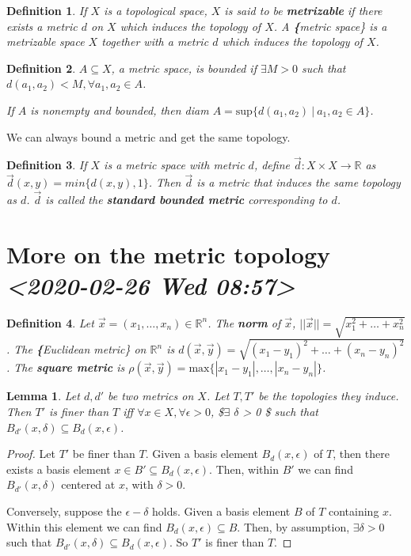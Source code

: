 \documentclass[11pt]{article}
\newtheorem{lemma}{Lemma}[section]
\newtheorem{definition}{Definition}[section]
\begin{document}
\begin{definition}
If \(X\) is a topological space, \(X\) is said to be \textbf{metrizable} if there
exists a metric \(d\) on \(X\) which induces the topology of \(X\). A \textbf\{metric
space\} is a metrizable space \(X\) together with a metric \(d\) which induces the
topology of \(X\). 
\end{definition}

\begin{definition}
\(A\subseteq X\), a metric space, is bounded if \(\exists M > 0\) such that
\(d(a_1,a_2) < M, \forall a_1,a_2 \in A\). 

If \(A\) is nonempty and bounded, then diam \(A = \text{sup}\{ d(a_1, a_2)\ |\ a_1,
a_2 \in A\}\). 
\end{definition}

We can always bound a metric and get the same topology. 
\begin{definition}
If \(X\) is a metric space with metric \(d\), define \(\vec{d}: X\times
X\rightarrow\mathbb{R}\) as \(\vec{d}(x,y) = min\{ d(x,y), 1\}\). Then \(\vec{d}\)
is a metric that induces the same topology as \(d\). \(\vec{d}\) is called the
\textbf{standard bounded metric} corresponding to \(d\). 
\end{definition}

\section{More on the metric topology \textit{<2020-02-26 Wed 08:57>}}
\label{sec:orgb517c71}
\begin{definition}
Let \(\vec{x} = (x_1,\ldots, x_n) \in \mathbb{R}^n\). The \textbf{norm} of
\(\vec{x}\), \(||\vec{x}|| = \sqrt{x_1^2 + \ldots + x_n^2}\). The \textbf\{Euclidean
metric\} on \(\mathbb{R}^n\) is \(d(\vec{x}, \vec{y}) = \sqrt{(x_1 - y_1)^2 +
\ldots + (x_n - y_n)^2}\). The \textbf{square metric} is \(\rho(\vec{x},\vec{y}) =
\text{max}\{|x_1 - y_1|, \ldots, |x_n - y_n|\}\). 
\end{definition}
\begin{lemma}
Let \(d, d'\) be two metrics on \(X\). Let \(T, T'\) be the topologies they induce.
Then \(T'\) is finer than \(T\) iff \(\forall x \in X, \forall \epsilon > 0\),
\$\(\exists\) \(\delta\) > 0 \$ such that \(B_{d'}(x,\delta) \subseteq B_d(x,\epsilon)\).
\end{lemma}
\begin{proof}
Let \(T'\) be finer than \(T\). Given a basis element \(B_d(x,\epsilon)\) of \(T\), then
there exists a basis element \(x \in B' \subseteq B_d(x,\epsilon)\). Then, within
\(B'\) we can find \(B_{d'}(x,\delta)\) centered at \(x\), with \(\delta > 0\).

Conversely, suppose the \(\epsilon-\delta\) holds. Given a basis element \(B\) of
\(T\) containing \(x\). Within this element we can find \(B_d(x,\epsilon) \subseteq
B\). Then, by assumption, \(\exists \delta > 0\) such that \(B_{d'}(x,\delta)
\subseteq B_d(x,\epsilon)\). So \(T'\) is finer than \(T\). 
\end{proof}
\end{document}
